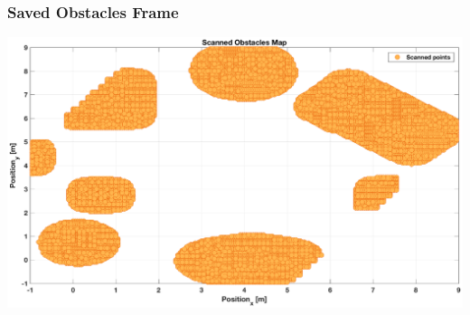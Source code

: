 	\begin{frame}
		\frametitle{Saved Obstacles Frame}
		\centering
		\includegraphics[scale=0.46]{pictures/intial_map.eps}
	\end{frame}

